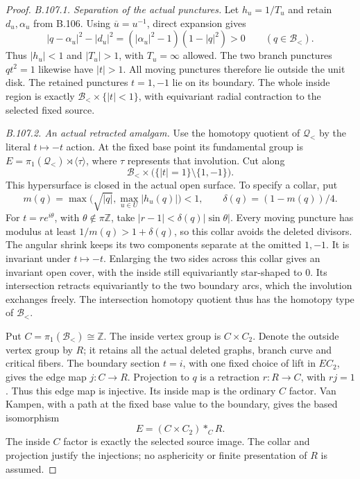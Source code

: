 \begin{proof}
\emph{B.107.1. Separation of the actual punctures.}
Let $h_u=1/T_u$ and retain $d_u,\alpha_u$ from B.106.
Using $\overline u=u^{-1}$, direct expansion gives
\[
 |q-\alpha_u|^2-|d_u|^2
       =(|\alpha_u|^2-1)(1-|q|^2)>0
       \qquad(q\in\mathscr B_<).
\]
Thus $|h_u|<1$ and $|T_u|>1$, with $T_u=\infty$ allowed.
The two branch punctures $qt^2=1$ likewise have $|t|>1$.
All moving punctures therefore lie outside the unit disk.
The retained punctures $t=1,-1$ lie on its boundary.
The whole inside region is exactly $\mathscr B_<\times\{|t|<1\}$,
with equivariant radial contraction to the selected fixed source.

\emph{B.107.2. An actual retracted amalgam.}
Use the homotopy quotient of $\mathscr Q_<$ by the literal
$t\mapsto-t$ action. At the fixed base point its fundamental
group is $E=\pi_1(\mathscr Q_<)\rtimes\langle\tau\rangle$,
where $\tau$ represents that involution. Cut along
\[
 \mathscr B_<\times
       \bigl(\{|t|=1\}\setminus\{1,-1\}\bigr).
\]
This hypersurface is closed in the actual open surface. To specify
a collar, put
\[
 m(q)=\max\bigl(\sqrt{|q|},\max_{u\in U}|h_u(q)|\bigr)<1,
 \qquad \delta(q)=(1-m(q))/4.
\]
For $t=re^{i\theta}$, with $\theta\notin\pi\mathbb Z$, take
$|r-1|<\delta(q)|\sin\theta|$. Every moving puncture has modulus
at least $1/m(q)>1+\delta(q)$, so this collar avoids the deleted
divisors. The angular shrink keeps its two components separate at
the omitted $1,-1$. It is invariant under $t\mapsto-t$.
Enlarging the two sides across this collar gives an invariant
open cover, with the inside still equivariantly star-shaped to $0$.
Its intersection retracts
equivariantly to the two boundary arcs, which the involution
exchanges freely. The intersection homotopy quotient thus has
the homotopy type of $\mathscr B_<$.

Put $C=\pi_1(\mathscr B_<)\cong\mathbb Z$. The inside vertex
group is $C\times C_2$. Denote the outside vertex group by $R$;
it retains all the actual deleted graphs, branch curve and critical
fibers. The boundary section $t=i$, with one fixed choice of lift
in $EC_2$, gives the edge map $j:C\to R$. Projection to $q$
is a retraction $r:R\to C$, with $rj=1$. Thus this edge map
is injective. Its inside map is the ordinary $C$ factor.
Van Kampen, with a path at the fixed base value to the boundary,
gives the based isomorphism
\begin{equation}\label{eq:B107-amalgam}
 E=(C\times C_2)*_C R.
\end{equation}
The inside $C$ factor is exactly the selected source image.
The collar and projection justify the injections; no asphericity
or finite presentation of $R$ is assumed.


\end{proof}
